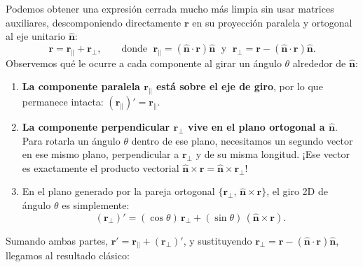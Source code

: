 \documentclass[11pt,letterpaper]{article}
\begin{document}
Podemos obtener una expresión cerrada mucho más limpia sin usar matrices auxiliares, descomponiendo directamente $\mathbf{r}$ en su proyección paralela y ortogonal al eje unitario $\hat{\mathbf{n}}$:
\begin{equation}
  \mathbf{r} = \mathbf{r}_\parallel + \mathbf{r}_\perp, \qquad\text{donde }\;
  \mathbf{r}_\parallel = (\hat{\mathbf{n}}\cdot\mathbf{r})\hat{\mathbf{n}}
  \;\text{ y }\;
  \mathbf{r}_\perp = \mathbf{r} - (\hat{\mathbf{n}}\cdot\mathbf{r})\hat{\mathbf{n}}.
\end{equation}
Observemos qué le ocurre a cada componente al girar un ángulo $\theta$ alrededor de $\hat{\mathbf{n}}$:
\begin{enumerate}
  \item \textbf{La componente paralela $\mathbf{r}_\parallel$ está sobre el eje de giro}, por lo que permanece intacta: $(\mathbf{r}_\parallel)' = \mathbf{r}_\parallel$.
  \item \textbf{La componente perpendicular $\mathbf{r}_\perp$ vive en el plano ortogonal a $\hat{\mathbf{n}}$}. Para rotarla un ángulo $\theta$ dentro de ese plano, necesitamos un segundo vector en ese mismo plano, perpendicular a $\mathbf{r}_\perp$ y de su misma longitud. ¡Ese vector es exactamente el producto vectorial $\hat{\mathbf{n}}\times\mathbf{r} = \hat{\mathbf{n}}\times\mathbf{r}_\perp$!
  \item En el plano generado por la pareja ortogonal $\{\mathbf{r}_\perp,\, \hat{\mathbf{n}}\times\mathbf{r}\}$, el giro 2D de ángulo $\theta$ es simplemente:
  \[
    (\mathbf{r}_\perp)' = (\cos\theta)\,\mathbf{r}_\perp + (\sin\theta)\,(\hat{\mathbf{n}}\times\mathbf{r}).
  \]
\end{enumerate}
Sumando ambas partes, $\mathbf{r}' = \mathbf{r}_\parallel + (\mathbf{r}_\perp)'$, y sustituyendo $\mathbf{r}_\perp = \mathbf{r} - (\hat{\mathbf{n}}\cdot\mathbf{r})\hat{\mathbf{n}}$, llegamos al resultado clásico:
\end{document}
